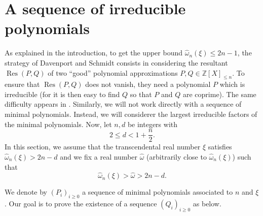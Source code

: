 \documentclass[10pt,a4paper]{amsart}
\numberwithin{equation}{section}
\DeclareMathOperator\Res{Res}
\newcommand\bZ{\mathbb{Z}}
\newcommand\homega{\widehat{\omega}}\newcommand\HH{\mathcal{H}}
\theoremstyle{definition}
\theoremstyle{plain}
\begin{document}
\section{A sequence of irreducible polynomials}
\label{section: sequence des Q_i}

As explained in the introduction, to get the upper bound $\homega_n(\xi) \leq 2n-1$, the strategy of Davenport and Schmidt \cite{davenport1969approximation} consists in considering the resultant $\Res(P,Q)$ of two ``good'' polynomial approximations $P,Q\in \bZ[X]_{\leq n}$. To ensure that $\Res(P,Q)$ does not vanish, they need a polynomial $P$ which is irreducible (for it is then easy to find $Q$ so that $P$ and $Q$ are coprime). The same difficulty appears in \cite{bugeaudSchleischitz2016Uniform}. Similarly, we will not work directly with a sequence of minimal polynomials. Instead, we will considerer the largest irreducible factors of the minimal polynomials. Now, let $n,d$ be integers with
\[
2\leq d < 1+ \frac{n}{2}.
\]
In this section, we assume that the transcendental real number $\xi$ satisfies $\homega_n(\xi) > 2n -d$ and we fix a real number $\homega$ (arbitrarily close to $\homega_n(\xi)$) such that
\begin{equation}
\label{eq: notation homega}
\homega_n(\xi) > \homega > 2n -d.
\end{equation}

We denote by $(P_i)_{i\geq 0}$ a sequence of minimal polynomials associated to $n$ and $\xi$. Our goal is to prove the existence of a sequence $(Q_i)_{i\geq 0}$ as below.
\end{document}
